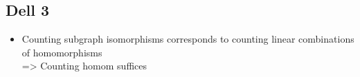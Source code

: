 \subsection{Dell 3}

\begin{itemize}
    \item Counting subgraph isomorphisms corresponds to counting linear combinations of homomorphisms\\
    => Counting homom suffices
\end{itemize}